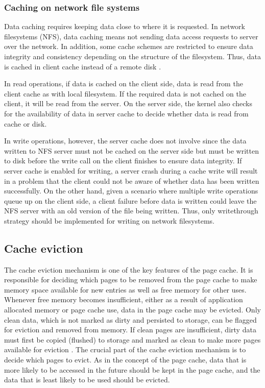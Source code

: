 \subsubsection{Caching on network file systems}

Data caching requires keeping data close to where it is requested. 
In network filesystems (NFS), data caching means not sending data access 
requests to server over the network. 
In addition, some cache schemes are restricted to ensure data integrity and 
consistency depending on the structure of the filesystem.
Thus, data is cached in client cache instead of a remote disk 
\cite{eisler2001managing}. 

In read operations, if data is cached on the client side, data is read from the 
client cache as with local filesystem. If the required data is not cached on the 
client, it will be read from the server. On the server side, the kernel also checks 
for the availability of data in server cache to decide whether data is read from 
cache or disk. 

In write operations, however, the server cache does not involve since the data 
written to NFS server must not be cached on the server side but must be written 
to disk before the write call on the client finishes to ensure data integrity. 
If server cache is enabled for writing, a server crash during a cache 
write will result in a problem that the client could not be aware of whether 
data has been written successfully. 
On the other hand, given a scenario where multiple write operations queue up 
on the client side, a client failure before data is written could leave the NFS 
server with an old version of the file being written. 
Thus, only writethrough strategy should be implemented for writing on 
network filesystems. 

\subsection{Cache eviction}

The cache eviction mechanism is one of the key features of the
page cache. 
It is responsible for deciding which pages to be removed from the 
page cache to make memory space available for new entries as well as 
free memory for other uses. 
Whenever free memory becomes insufficient, either as a result of application 
allocated memory or page cache use, data in the page cache may be evicted. 
Only clean data, which is not marked as dirty and persisted to storage, 
can be flagged for eviction and removed from memory. 
If clean pages are insufficient, dirty data must first be copied (flushed) 
to storage and marked as clean to make more pages available for eviction 
\cite{linuxdev3rd2010,bovet2005understanding}. 
The crucial part of the cache eviction mechanism is to decide which pages 
to evict. As in the concept of the page cache, data that is more likely 
to be accessed in the future should be kept in the page cache, and the data 
that is least likely to be used should be evicted. 

